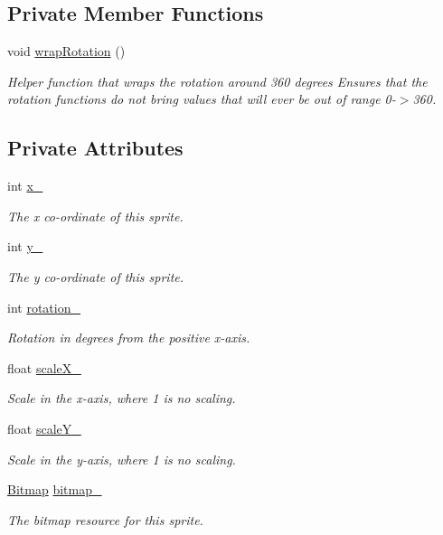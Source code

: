 \subsection*{Private Member Functions}
\begin{DoxyCompactItemize}
\item 
void \hyperlink{class_sprite_ac00655a46db80a5b8b76bce11b351fd1}{wrap\-Rotation} ()
\begin{DoxyCompactList}\small\item\em Helper function that wraps the rotation around 360 degrees Ensures that the rotation functions do not bring values that will ever be out of range 0-\/$>$360. \end{DoxyCompactList}\end{DoxyCompactItemize}
\subsection*{Private Attributes}
\begin{DoxyCompactItemize}
\item 
int \hyperlink{class_sprite_ae4b1f0a19b406ffccc78e18f5e40e6f6}{x\-\_\-}
\begin{DoxyCompactList}\small\item\em The x co-\/ordinate of this sprite. \end{DoxyCompactList}\item 
int \hyperlink{class_sprite_afd9f444fcd6f2d3d6bb0d7686e09d16e}{y\-\_\-}
\begin{DoxyCompactList}\small\item\em The y co-\/ordinate of this sprite. \end{DoxyCompactList}\item 
int \hyperlink{class_sprite_af429cf5ba45033ece6afa3371ae1ca32}{rotation\-\_\-}
\begin{DoxyCompactList}\small\item\em Rotation in degrees from the positive x-\/axis. \end{DoxyCompactList}\item 
float \hyperlink{class_sprite_aab809e2cb3503cd71f3acf00cb8bf03a}{scale\-X\-\_\-}
\begin{DoxyCompactList}\small\item\em Scale in the x-\/axis, where 1 is no scaling. \end{DoxyCompactList}\item 
float \hyperlink{class_sprite_a26863cb8bcd854eb4f4c8777a79ce379}{scale\-Y\-\_\-}
\begin{DoxyCompactList}\small\item\em Scale in the y-\/axis, where 1 is no scaling. \end{DoxyCompactList}\item 
\hyperlink{class_bitmap}{Bitmap} \hyperlink{class_sprite_acc220b22693eaa6ca50174b1a11a22d0}{bitmap\-\_\-}
\begin{DoxyCompactList}\small\item\em The bitmap resource for this sprite. \end{DoxyCompactList}\end{DoxyCompactItemize}


